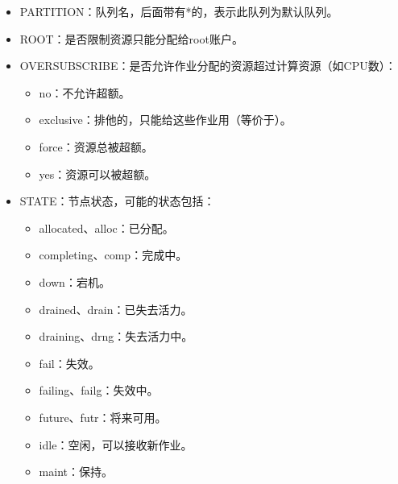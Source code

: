 \documentclass[a4paper,12pt,english]{sphinxmanual}
\begin{document}
\begin{itemize}
\item {} 
\sphinxAtStartPar
PARTITION：队列名，后面带有*的，表示此队列为默认队列。

\item {} 
\sphinxAtStartPar
ROOT：是否限制资源只能分配给root账户。

\item {} 
\sphinxAtStartPar
OVERSUBSCRIBE：是否允许作业分配的资源超过计算资源（如CPU数）：
\begin{itemize}
\item {} 
\sphinxAtStartPar
no：不允许超额。

\item {} 
\sphinxAtStartPar
exclusive：排他的，只能给这些作业用（等价于）。

\item {} 
\sphinxAtStartPar
force：资源总被超额。

\item {} 
\sphinxAtStartPar
yes：资源可以被超额。

\end{itemize}

\item {} 
\sphinxAtStartPar
STATE：节点状态，可能的状态包括：
\begin{itemize}
\item {} 
\sphinxAtStartPar
allocated、alloc：已分配。

\item {} 
\sphinxAtStartPar
completing、comp：完成中。

\item {} 
\sphinxAtStartPar
down：宕机。

\item {} 
\sphinxAtStartPar
drained、drain：已失去活力。

\item {} 
\sphinxAtStartPar
draining、drng：失去活力中。

\item {} 
\sphinxAtStartPar
fail：失效。

\item {} 
\sphinxAtStartPar
failing、failg：失效中。

\item {} 
\sphinxAtStartPar
future、futr：将来可用。

\item {} 
\sphinxAtStartPar
idle：空闲，可以接收新作业。

\item {} 
\sphinxAtStartPar
maint：保持。


\end{itemize}
\end{itemize}
\end{document}
